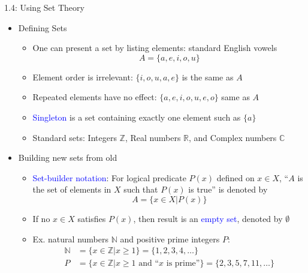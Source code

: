 \documentclass[10pt,english]{beamer}
\begin{document}
\begin{frame}{1.4: Using Set Theory}

\begin{itemize}
\setlength\itemsep{3mm}
\item<1-> Defining Sets \vspace{1mm}
\begin{itemize} 
  \setlength\itemsep{1.5mm}
  \item One can present a set by listing elements: standard English vowels \[A= \{ a,e,i,o,u \} \]
  \item Element order is irrelevant: $\{ i,o,u,a,e \}$ is the same as $A$
  \item Repeated elements have no effect: $\{ a,e,i,o,u,e,o \}$ same as $A$
  \item \textcolor{blue}{Singleton} is a set containing exactly one element such as $\{a\}$
  \item Standard sets: Integers $\mathbb{Z}$, Real numbers $\mathbb{R}$, and Complex numbers $\mathbb{C}$
\end{itemize}

\item<2-> Building new sets from old \vspace{1mm}
\begin{itemize} 
  \setlength\itemsep{1.5mm}
  \item \textcolor{blue}{Set-builder notation}: For logical predicate $P(x)$ defined on $x\in X$, ``$A$ is the set of elements in $X$ such that $P(x)$ is true'' is denoted by
\[ A = \{ x\in X | P(x) \} \]
  \item If no $x\in X$ satisfies $P(x)$, then result is an \textcolor{blue}{empty set}, denoted by $\emptyset$
  \item Ex. natural numbers $\mathbb{N}$ and positive prime integers $P$:
\begin{align*}
  \mathbb{N} &= \{ x\in \mathbb{Z} | x\geq 1 \} = \{ 1,2,3,4,\ldots \} \\
  P &= \{ x\in \mathbb{Z} | x\geq 1 \textrm{ and ``}x\textrm{ is prime''} \} = \{ 2,3,5,7,11,\ldots \}
\end{align*}
\end{itemize}
\end{itemize}
\end{frame}

\end{document}
